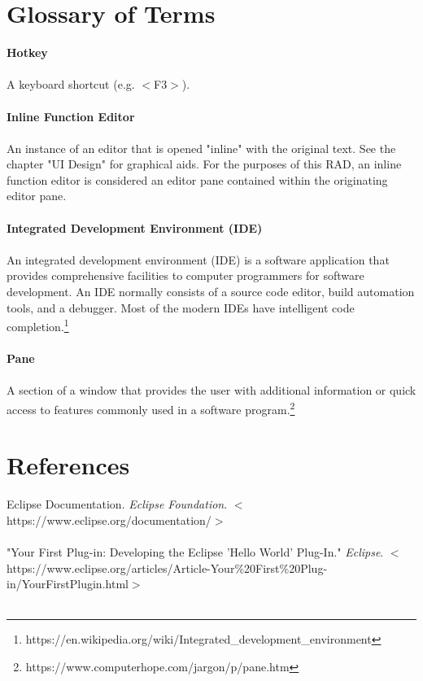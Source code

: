 \documentclass[]{report}
\begin{document}
\chapter{Glossary of Terms}

	\textbf{Hotkey}\\ \\
	A keyboard shortcut (e.g. $<$F3$>$).\\ \\
	
	\noindent\textbf{Inline Function Editor}\\ \\
	An instance of an editor that is opened "inline" with the original text.  See the chapter "UI Design" for graphical aids.  For the purposes of this RAD, an inline function editor is considered an editor pane contained within the originating editor pane.\\ \\

	\noindent\textbf{Integrated Development Environment (IDE)}\\ \\
	An integrated development environment (IDE) is a software application that provides comprehensive facilities to computer programmers for software development. An IDE normally consists of a source code editor, build automation tools, and a debugger. Most of the modern IDEs have intelligent code completion.\footnote{https://en.wikipedia.org/wiki/Integrated\_development\_environment}\\ \\
	
	\noindent\textbf{Pane}\\ \\
	A section of a window that provides the user with additional information or quick access to features commonly used in a software program.\footnote{https://www.computerhope.com/jargon/p/pane.htm}
	
\chapter{References}
	
	Eclipse Documentation. \textit{Eclipse Foundation}. $<$https://www.eclipse.org/documentation/$>$\\ \\
	
	\noindent "Your First Plug-in: Developing the Eclipse 'Hello World' Plug-In." \textit{Eclipse}.
	\hspace{1in}$<$https://www.eclipse.org/articles/Article-Your\%20First\%20Plug-in/YourFirstPlugin.html$>$\\ \\
\end{document}
